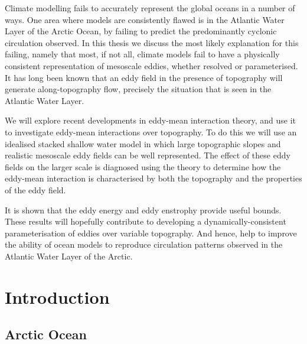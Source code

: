 \documentclass[12pt,a4paper]{report}
\begin{document}
	
	

Climate modelling fails to accurately represent the global oceans in a number of ways. 
One area where models are consistently flawed is in the Atlantic Water Layer of the Arctic Ocean,
by failing to predict the predominantly cyclonic circulation observed. In this thesis we
discuss the most likely explanation for this failing, namely that most, if not all, climate
models fail to have a physically consistent representation of mesoscale eddies, whether
resolved or parameterised. It has long been known that an eddy field in the presence of
topography will generate along-topography flow, precisely the situation that is seen in the 
Atlantic Water Layer.

 We will explore recent developments in eddy-mean interaction theory,
and use it to investigate eddy-mean interactions over topography. To do this we
will use an idealised stacked shallow water model in which large topographic slopes
and realistic mesoscale eddy fields can be well represented. The effect of these
eddy fields on the larger scale is diagnosed using the
 theory to determine how the eddy-mean interaction is characterised by both
 the topography and the properties of the eddy field.
 
 It is shown that the eddy energy and eddy enstrophy provide useful bounds. 
 These results will hopefully contribute to developing a dynamically-consistent
 parameterisation of eddies over variable topography. And hence, help to improve
 the ability of ocean models to reproduce circulation patterns observed in the 
 Atlantic Water Layer of the Arctic.
 

\chapter{Introduction}
\label{intro}

\glsresetall

\section{Arctic Ocean}
\label{arcticocean}
\end{document}
